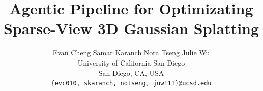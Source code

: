 \documentclass[10pt,twocolumn,letterpaper]{article}
\title{Agentic Pipeline for Optimizating Sparse-View 3D Gaussian Splatting}
\author{
Evan Cheng \quad Samar Karanch \quad Nora Tseng \quad Julie Wu\\
University of California San Diego\\
San Diego, CA, USA\\
{\tt\small \{evc010, skaranch, notseng, juw111\}@ucsd.edu}
}
\begin{document}
\maketitle
%     








{
    \small
    
    
    \nocite{*}
}

% 
\end{document}
